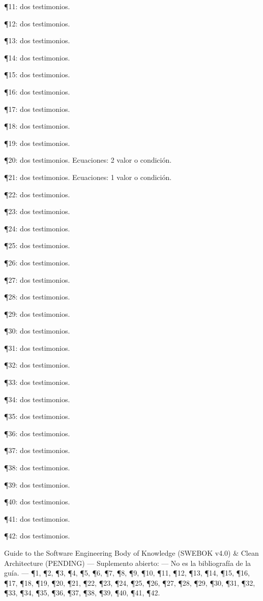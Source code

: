 \documentclass{book}
\begin{document}
\noindent ¶11: dos testimonios.

\noindent ¶12: dos testimonios.

\noindent ¶13: dos testimonios.

\noindent ¶14: dos testimonios.

\noindent ¶15: dos testimonios.

\noindent ¶16: dos testimonios.

\noindent ¶17: dos testimonios.

\noindent ¶18: dos testimonios.

\noindent ¶19: dos testimonios.

\noindent ¶20: dos testimonios. Ecuaciones: 2 valor o condición.

\noindent ¶21: dos testimonios. Ecuaciones: 1 valor o condición.

\noindent ¶22: dos testimonios.

\noindent ¶23: dos testimonios.

\noindent ¶24: dos testimonios.

\noindent ¶25: dos testimonios.

\noindent ¶26: dos testimonios.

\noindent ¶27: dos testimonios.

\noindent ¶28: dos testimonios.

\noindent ¶29: dos testimonios.

\noindent ¶30: dos testimonios.

\noindent ¶31: dos testimonios.

\noindent ¶32: dos testimonios.

\noindent ¶33: dos testimonios.

\noindent ¶34: dos testimonios.

\noindent ¶35: dos testimonios.

\noindent ¶36: dos testimonios.

\noindent ¶37: dos testimonios.

\noindent ¶38: dos testimonios.

\noindent ¶39: dos testimonios.

\noindent ¶40: dos testimonios.

\noindent ¶41: dos testimonios.

\noindent ¶42: dos testimonios.

\medskip

\noindent Guide to the Software Engineering Body of Knowledge (SWEBOK v4.0) \& Clean Architecture (PENDING) --- Suplemento abierto: --- No es la bibliografía de la guía. --- \P1, \P2, \P3, \P4, \P5, \P6, \P7, \P8, \P9, \P10, \P11, \P12, \P13, \P14, \P15, \P16, \P17, \P18, \P19, \P20, \P21, \P22, \P23, \P24, \P25, \P26, \P27, \P28, \P29, \P30, \P31, \P32, \P33, \P34, \P35, \P36, \P37, \P38, \P39, \P40, \P41, \P42.
\end{document}
